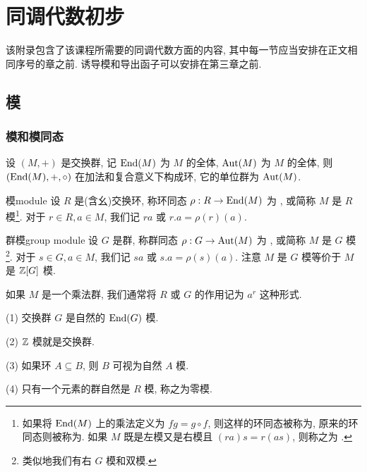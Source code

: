\renewcommand{\chaptermark}[1]{\markboth{\appendixname \, #1\,}{}}

\chapter{同调代数初步}\label{chap:homological_algebra}

该附录包含了该课程所需要的同调代数方面的内容, 其中每一节应当安排在正文相同序号的章之前. 诱导模和导出函子可以安排在第三章之前.

\section{模}\label{sec:modules}
\subsection{模和模同态}\label{subsec:modules_and_homomorphisms}
设 $(M,+)$ 是交换群, 记 ${\mathrm{End}}(M)$ 为 $M$ 的全体, ${\mathrm{Aut}}(M)$ 为 $M$ 的全体, 则 $({\mathrm{End}}(M),+,\circ)$ 在加法和复合意义下构成环, 它的单位群为 ${\mathrm{Aut}}(M)$.

\begin{definition}{模}{module}
设 $R$ 是(含幺)交换环, 称环同态 $\rho:R\to {\mathrm{End}}(M)$ 为 , 或简称 $M$ 是 $R$ 模\footnote{如果将 ${\mathrm{End}}(M)$ 上的乘法定义为 $fg=g\circ f$, 则这样的环同态被称为, 原来的环同态则被称为. 如果 $M$ 既是左模又是右模且 $(ra)s=r(as)$, 则称之为 .}. 对于 $r\in R, a\in M$, 我们记 $ra$ 或 $r.a=\rho(r)(a)$.
\end{definition}

\begin{definition}{群模}{group module}
设 $G$ 是群, 称群同态 $\rho:G\to {\mathrm{Aut}}(M)$ 为 , 或简称 $M$ 是 $G$ 模\footnote{类似地我们有右 $G$ 模和双模.}. 对于 $s\in G, a\in M$, 我们记 $sa$ 或 $s.a=\rho(s)(a)$. 注意 $M$ 是 $G$ 模等价于 $M$ 是 ${\mathbb{Z}}[G]$ 模.
\end{definition}

\begin{remark}
如果 $M$ 是一个乘法群, 我们通常将 $R$ 或 $G$ 的作用记为 $a^r$ 这种形式. 
\end{remark}

\begin{example}
(1) 交换群 $G$ 是自然的 ${\mathrm{End}}(G)$ 模.

(2) ${\mathbb{Z}}$ 模就是交换群.

(3) 如果环 $A\subseteq B$, 则 $B$ 可视为自然 $A$ 模.

(4) 只有一个元素的群自然是 $R$ 模, 称之为零模.
\end{example}

